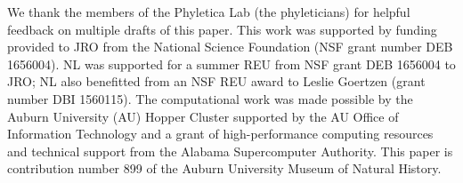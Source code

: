 We thank the members of the Phyletica Lab (the phyleticians) for helpful
feedback on multiple drafts of this paper.
This work was supported by funding provided to JRO from the National Science
Foundation (NSF grant number DEB 1656004).
NL was supported for a summer REU from NSF grant DEB 1656004 to JRO;
NL also benefitted from an NSF REU award to Leslie Goertzen (grant number
DBI 1560115).
The computational work was made possible by the Auburn University (AU) Hopper
Cluster supported by the AU Office of Information Technology
and
a grant of high-performance computing resources and technical support from the
Alabama Supercomputer Authority.
This paper is contribution number 899 of the Auburn University
Museum of Natural History.

